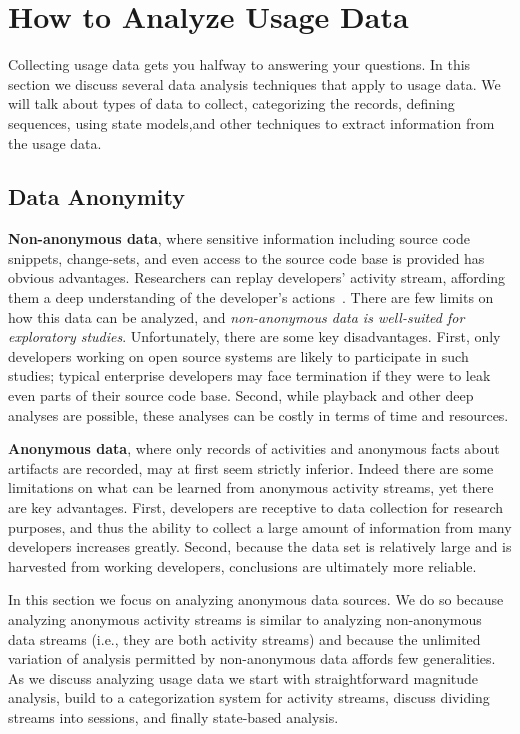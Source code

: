 \section{How to Analyze Usage Data}

Collecting usage data gets you halfway to answering your questions.  In this section we discuss several data analysis techniques that apply to usage data.  We will talk about types of data to collect, categorizing the records, defining sequences, using state models,and other techniques to extract information from the usage data.

\label{sec:dataAnonymity}
\subsection{Data Anonymity}

\noindent
{\bf Non-anonymous data}, where sensitive information including source code snippets, change-sets, and even access to the source code base is provided has obvious advantages. Researchers can replay developers' activity stream, affording them a deep understanding of the developer's actions~\cite{VakilianETAL2012UseDisuseMisuse}. There are few limits on how this data can be analyzed, and {\em non-anonymous data is well-suited for exploratory studies}. Unfortunately, there are some key disadvantages. First, only developers working on open source systems are likely to participate in such studies; typical enterprise developers may face termination if they were to leak even parts of their source code base. Second, while playback and other deep analyses are possible, these analyses can be costly in terms of time and resources. 

\vspace{0.1in}

\noindent
{\bf Anonymous data}, where only records of activities and anonymous facts about artifacts are recorded, may at first seem strictly inferior. Indeed there are some limitations on what can be learned from anonymous activity streams, yet there are key advantages. First, developers are receptive to data collection for research purposes, and thus the ability to collect a large amount of information from many developers increases greatly. Second, because the data set is relatively large and is harvested from working developers, conclusions are ultimately more reliable. 

In this section we focus on analyzing anonymous data sources. We do so because analyzing anonymous activity streams is similar to analyzing non-anonymous data streams (i.e., they are both activity streams) and because the unlimited variation of analysis permitted by non-anonymous data affords few generalities. As we discuss analyzing usage data we start with straightforward magnitude analysis, build to a categorization system for activity streams, discuss dividing streams into sessions, and finally state-based analysis. 

